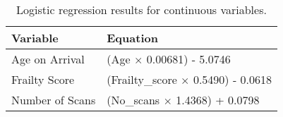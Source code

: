 \documentclass[thesis.tex]{subfiles}
\begin{document}
\newpage
\begin{table}[h!]
    \centering
    \begin{tabular}{ll} \toprule
       \textbf{Variable}  & \textbf{Equation}  \\ \midrule
     Age on Arrival &   (Age $\times$ 0.00681) - 5.0746  \\
     Frailty Score & (Frailty\_score $\times$ 0.5490) - 0.0618\\ 
     Number of Scans & (No\_scans $\times$ 1.4368) + 0.0798 \\ \bottomrule
     \end{tabular}
    \caption{Logistic regression results for continuous variables.}
    \label{tab:applogregcont}
\end{table}

\footnotesize{

\begin{longtable}{lll}\toprule
   

\end{longtable}}
\end{document}
